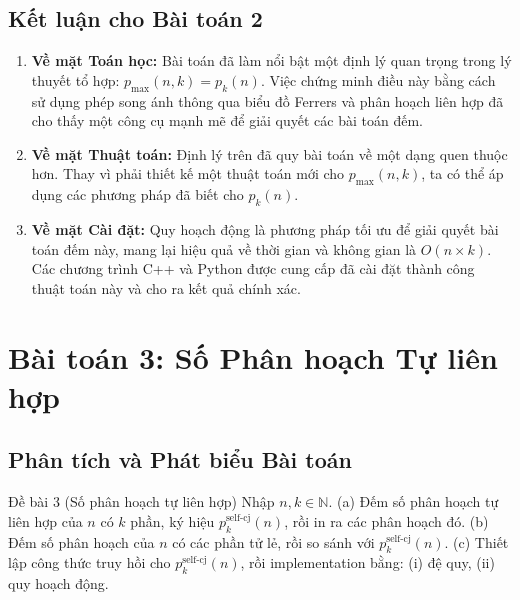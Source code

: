 \documentclass[a4paper,12pt]{article}
\begin{document}
\subsection{Kết luận cho Bài toán 2}
\begin{enumerate}
    \item \textbf{Về mặt Toán học:} Bài toán đã làm nổi bật một định lý quan trọng trong lý thuyết tổ hợp: $p_{\max}(n, k) = p_k(n)$. Việc chứng minh điều này bằng cách sử dụng phép song ánh thông qua biểu đồ Ferrers và phân hoạch liên hợp đã cho thấy một công cụ mạnh mẽ để giải quyết các bài toán đếm.
    \item \textbf{Về mặt Thuật toán:} Định lý trên đã quy bài toán về một dạng quen thuộc hơn. Thay vì phải thiết kế một thuật toán mới cho $p_{\max}(n, k)$, ta có thể áp dụng các phương pháp đã biết cho $p_k(n)$.
    \item \textbf{Về mặt Cài đặt:} Quy hoạch động là phương pháp tối ưu để giải quyết bài toán đếm này, mang lại hiệu quả về thời gian và không gian là $O(n \times k)$. Các chương trình C++ và Python được cung cấp đã cài đặt thành công thuật toán này và cho ra kết quả chính xác.
\end{enumerate}


\section{Bài toán 3: Số Phân hoạch Tự liên hợp}

\subsection{Phân tích và Phát biểu Bài toán}

\begin{problembox}{Đề bài 3 (Số phân hoạch tự liên hợp)}
    Nhập $n, k \in \mathbb{N}$. (a) Đếm số phân hoạch tự liên hợp của $n$ có $k$ phần, ký hiệu $p_k^{\text{self-cj}}(n)$, rồi in ra các phân hoạch đó. (b) Đếm số phân hoạch của $n$ có các phần tử lẻ, rồi so sánh với $p_k^{\text{self-cj}}(n)$. (c) Thiết lập công thức truy hồi cho $p_k^{\text{self-cj}}(n)$, rồi implementation bằng: (i) đệ quy, (ii) quy hoạch động.
\end{problembox}
\end{document}
